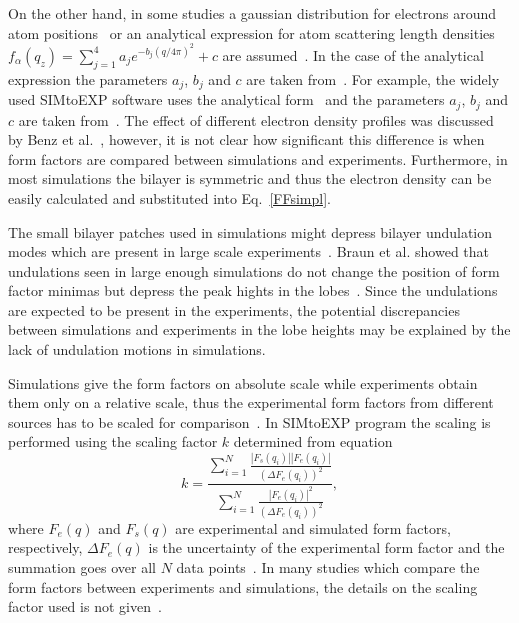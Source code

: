 \documentclass[aps,prl,superscriptaddress,twocolumn]{revtex4}
\begin{document}
On the other hand, in some studies a gaussian distribution for electrons around atom positions~\cite{benz05} 
or an analytical expression for atom scattering length densities $f_\alpha(q_z)=\sum_{j=1}^4a_je^{-b_j(q/4\pi)^2}+c$
are assumed~\cite{benz05,kucerka10,??}. In the case of the analytical expression the parameters 
$a_j$, $b_j$ and $c$ are taken from~\cite{??}. For example, the widely used SIMtoEXP software uses
the analytical form~\cite{kucerka10} and the parameters $a_j$, $b_j$ and $c$ are taken from~\cite{??}. The effect of different electron density profiles was discussed
by Benz et al.~\cite{benz05}, however, it is not clear how significant this difference is when form factors are
compared between simulations and experiments.
Furthermore, in most simulations the bilayer is symmetric and
thus the electron density can be easily calculated and substituted into Eq.~\ref{FFsimpl}. 

The small bilayer patches used in simulations might depress bilayer undulation modes which are present in large 
scale experiments~\cite{braun11}. Braun et al. showed that undulations seen in large enough simulations do
not change the position of form factor minimas but depress the peak hights in the lobes~\cite{braun11}.
Since the undulations are expected to be present in the experiments, the potential discrepancies 
between simulations and experiments in the lobe heights may be explained by the lack of undulation 
motions in simulations.

Simulations give the form factors on absolute scale while experiments obtain them only on a relative scale,
thus the experimental form factors from different sources has to be scaled for comparison~\cite{kucerka08a,kucerka10}.
In SIMtoEXP program the scaling is performed using the scaling factor $k$ determined from equation
\begin{equation}
k=\frac{\sum_{i=1}^N\frac{|F_s(q_i)||F_e(q_i)|}{(\Delta F_e(q_i))^2}}{\sum_{i=1}^N\frac{|F_e(q_i)|^2}{(\Delta F_e(q_i))^2}},
\end{equation} 
where $F_e(q)$ and $F_s(q)$ are experimental and simulated form factors, respectively, $\Delta F_e(q)$ is the uncertainty
of the experimental form factor and the summation goes over all $N$ data points~\cite{kucerka08a,kucerka10}.
In many studies which compare the form factors between experiments and simulations, the details on the scaling
factor used is not given~\cite{??}. 

\onecolumngrid
{}
\twocolumngrid
\end{document}
